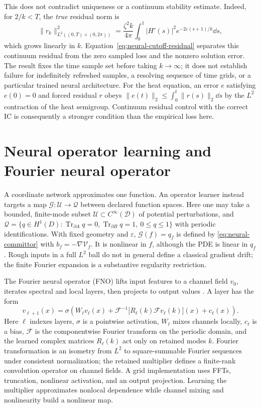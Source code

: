 \documentclass[12pt,a4paper,oneside]{book}
\begin{document}
This does not contradict uniqueness or a continuum stability estimate. Indeed, for $2/k<T$, the \emph{true} residual norm is
\begin{equation*}
 \|r_k\|_{L^2((0,T)\times(0,2\pi))}^2
 =\frac{\zeta^2 k}{4\pi}\int_0^1 |H'(s)|^2e^{-2\varepsilon(s+1)/k}\dd s,
\end{equation*}
which grows linearly in $k$. Equation~\eqref{eq:neural-cutoff-residual} separates this continuum residual from the
zero sampled loss and the nonzero solution error. The result fixes the time sample set before taking $k\to\infty$;
it does not establish failure for indefinitely refreshed samples, a resolving sequence of time grids, or a particular
trained neural architecture. For the heat equation, an error $e$ satisfying $e(0)=0$ and forced residual $r$ obeys
$\|e(t)\|_2\le\int_0^t\|r(s)\|_2\dd s$ by the $L^2$ contraction of the heat semigroup.
Continuum residual control with the correct IC is consequently a stronger condition than the empirical loss here.

\section{Neural operator learning and Fourier neural operator}
\label{subsec:neural-fno}

A coordinate network approximates one function. An operator learner instead targets a map
$\mathcal G:\mathcal U\to\mathcal Q$ between declared function spaces. Here one may take a bounded, finite-mode
subset $\mathcal U\subset C^\infty(\mathcal D)$ of potential perturbations, and
$\mathcal Q=\{q\in H^1(D):\operatorname{Tr}_{\partial A}q=0,
\operatorname{Tr}_{\partial B}q=1,\ 0\le q\le1\}$ with periodic identifications. With fixed geometry and
$\varepsilon$, $\mathcal G(f)=q_f$ is defined by \eqref{eq:neural-committor} with $b_f=-\nabla\mathcal V_f$.
It is nonlinear in $f$, although the PDE is linear in $q_f$. Rough inputs in a full $L^2$ ball do not in general
define a classical gradient drift; the finite Fourier expansion is a substantive regularity restriction.

The Fourier neural operator (FNO) lifts input features to a channel field $v_0$, iterates spectral and local layers,
then projects to output values \cite{li2020fno}. A layer has the form
\begin{equation*}
 v_{\ell+1}(x)=\sigma\left(W_\ell v_\ell(x)
 +\mathcal F^{-1}\big[R_\ell(k)\mathcal F v_\ell(k)\big](x)+c_\ell(x)\right).
\end{equation*}
Here $\ell$ indexes layers, $\sigma$ is a pointwise activation, $W_\ell$ mixes channels locally, $c_\ell$ is a bias,
$\mathcal F$ is the componentwise Fourier transform on the periodic domain, and the learned complex matrices
$R_\ell(k)$ act only on retained modes $k$. Fourier transformation is an isometry from $L^2$ to square-summable
Fourier sequences under consistent normalization; the retained multiplier defines a finite-rank convolution operator
on channel fields. A grid implementation uses FFTs, truncation, nonlinear activation, and an output projection.
Learning the multiplier approximates nonlocal dependence while channel mixing and nonlinearity build a nonlinear map.
\end{document}
